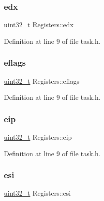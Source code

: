 \subsubsection{\texorpdfstring{edx}{edx}}
{\footnotesize\ttfamily \hyperlink{a00095_a435d1572bf3f880d55459d9805097f62_a435d1572bf3f880d55459d9805097f62}{uint32\+\_\+t} Registers\+::edx}



Definition at line 9 of file task.\+h.

\mbox{\label{a00132_a5216970c0d34ab4b53881f583839c8f9_a5216970c0d34ab4b53881f583839c8f9}} 
\subsubsection{\texorpdfstring{eflags}{eflags}}
{\footnotesize\ttfamily \hyperlink{a00095_a435d1572bf3f880d55459d9805097f62_a435d1572bf3f880d55459d9805097f62}{uint32\+\_\+t} Registers\+::eflags}



Definition at line 9 of file task.\+h.

\mbox{\label{a00132_ad5110c091e713dabd23f23a62d026c07_ad5110c091e713dabd23f23a62d026c07}} 
\subsubsection{\texorpdfstring{eip}{eip}}
{\footnotesize\ttfamily \hyperlink{a00095_a435d1572bf3f880d55459d9805097f62_a435d1572bf3f880d55459d9805097f62}{uint32\+\_\+t} Registers\+::eip}



Definition at line 9 of file task.\+h.

\mbox{\label{a00132_a8f9b382cca633127cb869add3aed7a41_a8f9b382cca633127cb869add3aed7a41}} 
\subsubsection{\texorpdfstring{esi}{esi}}
{\footnotesize\ttfamily \hyperlink{a00095_a435d1572bf3f880d55459d9805097f62_a435d1572bf3f880d55459d9805097f62}{uint32\+\_\+t} Registers\+::esi}



